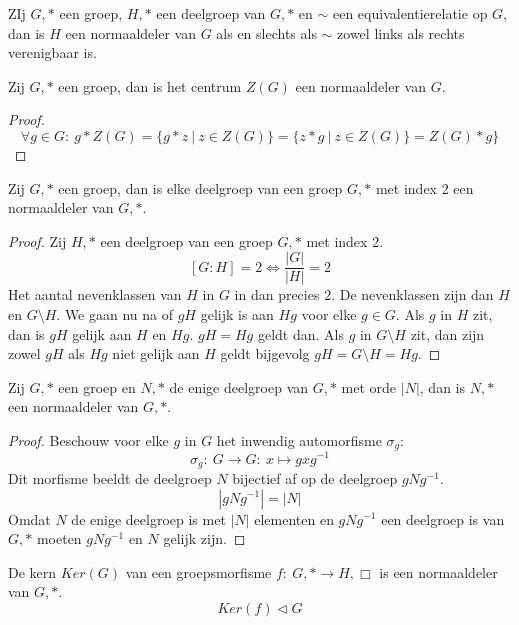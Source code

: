 \documentclass[main.tex]{subfiles}
\begin{document}
\begin{st}
  ZIj $G,*$ een groep, $H,*$ een deelgroep van $G,*$ en $\sim$ een equivalentierelatie op $G$, dan is $H$ een normaaldeler van $G$ als en slechts als $\sim$ zowel links als rechts verenigbaar is.

\end{st}

\begin{pr}
  Zij $G,*$ een groep, dan is het centrum $Z(G)$ een normaaldeler van $G$.
  \begin{proof}
    \[ \forall g\in G:\ g*Z(G) = \{ g*z \ |\ z\in Z(G) \} = \{ z*g \ |\ z\in Z(G) \} = Z(G)*g \} \]
  \end{proof}
\end{pr}

\begin{pr}
  Zij $G,*$ een groep, dan is elke deelgroep van een groep $G,*$ met index $2$ een normaaldeler van $G,*$.
  \begin{proof}
    Zij $H,*$ een deelgroep van een groep $G,*$ met index $2$.
    \[ [G:H] = 2 \Leftrightarrow \frac{|G|}{|H|} = 2 \]
    Het aantal nevenklassen van $H$ in $G$ in dan precies $2$.
    De nevenklassen zijn dan $H$ en $G\setminus H$.
    We gaan nu na of $gH$ gelijk is aan $Hg$ voor elke $g\in G$.
    Als $g$ in $H$ zit, dan is $gH$ gelijk aan $H$ en $Hg$. $gH=Hg$ geldt dan.
    Als $g$ in $G\setminus H$ zit, dan zijn zowel $gH$ als $Hg$ niet gelijk aan $H$ geldt bijgevolg $gH = G\setminus H = Hg$.
  \end{proof}
\end{pr}

\begin{pr}
  Zij $G,*$ een groep en $N,*$ de enige deelgroep van $G,*$ met orde $|N|$, dan is $N,*$ een normaaldeler van $G,*$.

  \begin{proof}
    Beschouw voor elke $g$ in $G$ het inwendig automorfisme $\sigma_{g}$:
    \[ \sigma_{g}:\ G \rightarrow G:\ x \mapsto gxg^{-1} \]
    Dit morfisme beeldt de deelgroep $N$ bijectief af op de deelgroep $gNg^{-1}$.
    \[ |gNg^{-1}| = |N| \]
    Omdat $N$ de enige deelgroep is met $|N|$ elementen en $gNg^{-1}$ een deelgroep is \waarom van $G,*$ moeten $gNg^{-1}$ en $N$ gelijk zijn.
  \end{proof}
\end{pr}

\begin{pr}
  De kern $Ker(G)$ van een groepsmorfisme $f:\ G,* \rightarrow H,\Box$ is een normaaldeler van $G,*$.
  \[ Ker(f) \triangleleft G \]
  
\end{pr}
\end{document}
